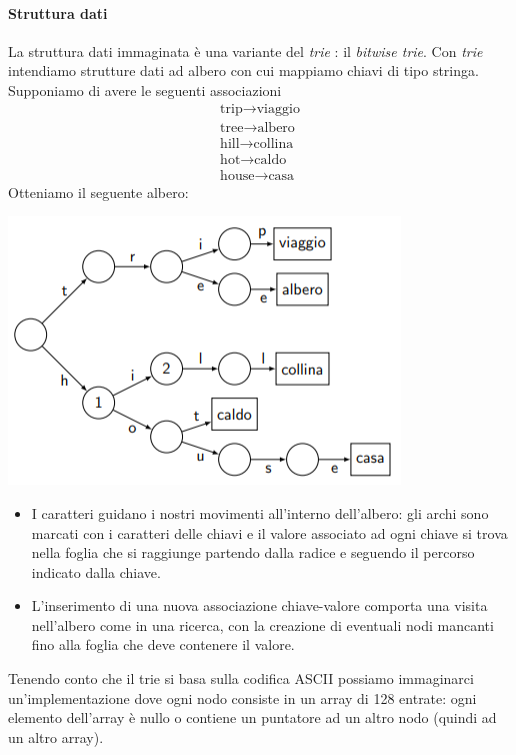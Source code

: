\paragraph{Struttura dati} La struttura dati immaginata è una variante del \emph{trie}
: il \emph{bitwise trie}. Con \emph{trie} intendiamo strutture dati ad albero con cui mappiamo chiavi di tipo stringa. Supponiamo di avere le seguenti associazioni
\[\begin{array}{l}\text{trip} \longrightarrow \text{viaggio}\\\text{tree} \longrightarrow \text{albero}\\\text{hill} \longrightarrow \text{collina}\\\text{hot} \longrightarrow \text{caldo}\\\text{house} \longrightarrow \text{casa} \end{array}\]
Otteniamo il seguente albero:
\begin{center}
	\includegraphics{img/215.PNG}
\end{center}
\begin{itemize}
	\item I caratteri guidano i nostri movimenti all'interno dell'albero: gli archi sono marcati con i caratteri delle chiavi e il valore associato ad ogni chiave si trova nella foglia che si raggiunge partendo dalla radice e seguendo il percorso indicato dalla chiave. 
	\item L'inserimento di una nuova associazione chiave-valore comporta una visita nell'albero come in una ricerca, con la creazione di eventuali nodi mancanti fino alla foglia che deve contenere il valore.
\end{itemize}
Tenendo conto che il trie si basa sulla codifica ASCII possiamo immaginarci un'implementazione dove ogni nodo consiste in un array di 128 entrate: ogni elemento dell'array è nullo o contiene un puntatore ad un altro nodo (quindi ad un altro array).

